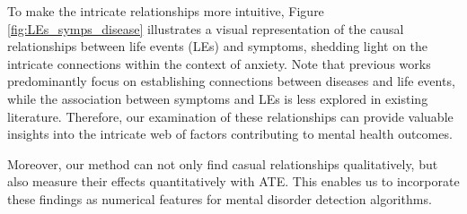 To make the intricate relationships more intuitive, Figure \ref{fig:LEs_symps_disease} illustrates a visual representation of the causal relationships between life events (LEs) and symptoms, shedding light on the intricate connections within the context of anxiety. Note that previous works predominantly focus on establishing connections between diseases and life events, while the association between symptoms and LEs is less explored in existing literature. Therefore, our examination of these relationships can provide valuable insights into the intricate web of factors contributing to mental health outcomes.

Moreover, our method can not only find casual relationships qualitatively, but also measure their effects quantitatively with ATE. This enables us to incorporate these findings as numerical features for mental disorder detection algorithms. 






